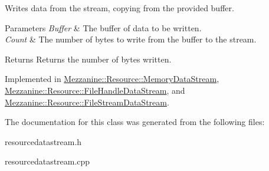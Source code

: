 Writes data from the stream, copying from the provided buffer. 


\begin{DoxyParams}{Parameters}
{\em Buffer} & The buffer of data to be written. \\
\hline
{\em Count} & The number of bytes to write from the buffer to the stream. \\
\hline
\end{DoxyParams}
\begin{DoxyReturn}{Returns}
Returns the number of bytes written. 
\end{DoxyReturn}


Implemented in \hyperlink{classMezzanine_1_1Resource_1_1MemoryDataStream_a5c1e161caf74c74d7d6f9c2d0d5718b1}{Mezzanine::Resource::MemoryDataStream}, \hyperlink{classMezzanine_1_1Resource_1_1FileHandleDataStream_aa966e5def906aae90c8f5bf0aa9e8678}{Mezzanine::Resource::FileHandleDataStream}, and \hyperlink{classMezzanine_1_1Resource_1_1FileStreamDataStream_a1d4f4788475e9d2bf2d720b47b4ad7f0}{Mezzanine::Resource::FileStreamDataStream}.



The documentation for this class was generated from the following files:\begin{DoxyCompactItemize}
\item 
resourcedatastream.h\item 
resourcedatastream.cpp\end{DoxyCompactItemize}

